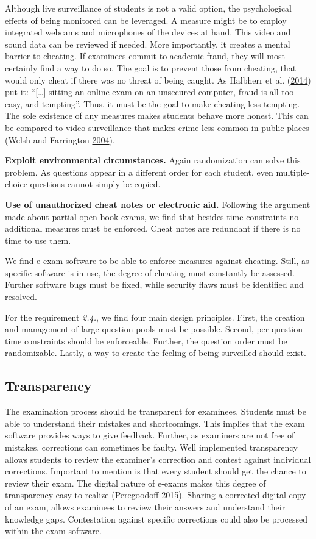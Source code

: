 Although live surveillance of students is not a valid option, the
psychological effects of being monitored can be leveraged. A measure
might be to employ integrated webcams and microphones of the devices at
hand. This video and sound data can be reviewed if needed. More
importantly, it creates a mental barrier to cheating. If examinees
commit to academic fraud, they will most certainly find a way to do so.
The goal is to prevent those from cheating, that would only cheat if
there was no threat of being caught. As Halbherr et al.
(\protect\hyperlink{ref-Halbherr2014}{2014}) put it: ``{[}\ldots{]}
sitting an online exam on an unsecured computer, fraud is all too easy,
and tempting''. Thus, it must be the goal to make cheating less
tempting. The sole existence of any measures makes students behave more
honest. This can be compared to video surveillance that makes crime less
common in public places (Welsh and Farrington
\protect\hyperlink{ref-WELSH2004}{2004}).

\textbf{Exploit environmental circumstances.} Again randomization can
solve this problem. As questions appear in a different order for each
student, even multiple-choice questions cannot simply be copied.

\textbf{Use of unauthorized cheat notes or electronic aid.} Following
the argument made about partial open-book exams, we find that besides
time constraints no additional measures must be enforced. Cheat notes
are redundant if there is no time to use them.

We find e-exam software to be able to enforce measures against cheating.
Still, as specific software is in use, the degree of cheating must
constantly be assessed. Further software bugs must be fixed, while
security flaws must be identified and resolved.

For the requirement \emph{2.4.}, we find four main design principles.
First, the creation and management of large question pools must be
possible. Second, per question time constraints should be enforceable.
Further, the question order must be randomizable. Lastly, a way to
create the feeling of being surveilled should exist.

\hypertarget{transparency}{%
\subsection{Transparency}\label{transparency}}

The examination process should be transparent for examinees. Students
must be able to understand their mistakes and shortcomings. This implies
that the exam software provides ways to give feedback. Further, as
examiners are not free of mistakes, corrections can sometimes be faulty.
Well implemented transparency allows students to review the examiner's
correction and contest against individual corrections. Important to
mention is that every student should get the chance to review their
exam. The digital nature of e-exams makes this degree of transparency
easy to realize (Peregoodoff \protect\hyperlink{ref-GLM2015}{2015}).
Sharing a corrected digital copy of an exam, allows examinees to review
their answers and understand their knowledge gaps. Contestation against
specific corrections could also be processed within the exam software.

